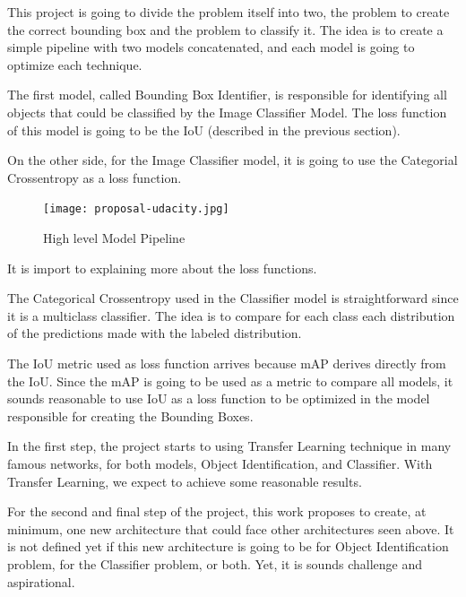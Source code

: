 \documentclass[11pt, a4paper, twocolumn]{article}
\begin{document}
This project is going to divide the problem itself into two, the problem to create the correct bounding box and the problem to classify it. The idea is to create a simple pipeline with two models concatenated, and each model is going to optimize each technique.

The first model, called Bounding Box Identifier, is responsible for identifying all objects that could be classified by the Image Classifier Model. The loss function of this model is going to be the IoU (described in the previous section).

On the other side, for the Image Classifier model, it is going to use the Categorial Crossentropy as a loss function.

\begin{figure}[ht]
	\centering
	\texttt{[image: proposal-udacity.jpg]}
	\caption{\scriptsize High level Model Pipeline}
\end{figure}

It is import to explaining more about the loss functions. 

The Categorical Crossentropy used in the Classifier model is straightforward since it is a multiclass classifier. The idea is to compare for each class each distribution of the predictions made with the labeled distribution.

The IoU metric used as loss function arrives because mAP derives directly from the IoU. Since the mAP is going to be used as a metric to compare all models, it sounds reasonable to use IoU as a loss function to be optimized in the model responsible for creating the Bounding Boxes.

In the first step, the project starts to using Transfer Learning technique in many famous networks, for both models, Object Identification, and Classifier. With Transfer Learning, we expect to achieve some reasonable results.

For the second and final step of the project, this work proposes to create, at minimum, one new architecture that could face other architectures seen above. It is not defined yet if this new architecture is going to be for Object Identification problem, for the Classifier problem, or both. Yet, it is sounds challenge and aspirational.

 


{}
\end{document}
